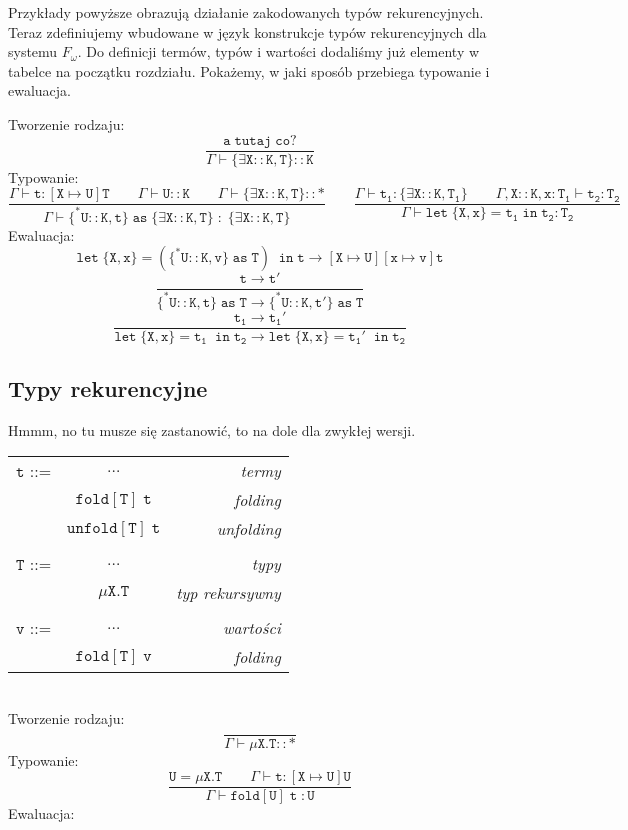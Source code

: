 \documentclass[11pt,leqno]{article}
\begin{document}
\normalsize{
Przykłady powyższe obrazują działanie zakodowanych typów rekurencyjnych. Teraz zdefiniujemy wbudowane w język konstrukcje typów rekurencyjnych dla systemu $F_\omega$. Do definicji termów, typów i wartości dodaliśmy już elementy w tabelce na początku rozdziału. Pokażemy, w jaki sposób przebiega typowanie i ewaluacja. \\
}


Tworzenie rodzaju:
 	\[\mathtt{ \frac{a\;tutaj\;co?}{\Gamma \vdash \{\exists X::K,T\}::K}
		}
	\]
Typowanie:
 	\[\mathtt{ \frac{\Gamma \vdash t:[X \mapsto U]T\hspace{2em}\Gamma \vdash U::K \hspace{2em}\Gamma \vdash \{\exists X::K,T\}::\ast}{\Gamma \vdash \{^*U::K,t\}\;as\;\{\exists X::K,T\} \; : \; \{\exists X::K,T\}}
                   \qquad
                   \frac{\Gamma \vdash t_1:\{\exists X::K,T_1\}\hspace{2em}\Gamma,X::K,x:T_1 \vdash t_2:T_2}{\Gamma \vdash let\;\{X,x\}=t_1\;in\;t_2:T_2}
		}
	\]
Ewaluacja:
 	\[\mathtt{ let\;\{X,x\}=(\{^*U::K,v\}\;as\;T)\;\;in\;t \longrightarrow [X \mapsto U][x \mapsto v]t
		}
	\]
 	\[\mathtt{ \frac{t \longrightarrow t'}{\{^*U::K,t\}\;as\;T \longrightarrow \{^*U::K,t'\}\;as\;T}
		}
	\]
 	\[\mathtt{ \frac{t_1\longrightarrow t_1'}{let\;\{X,x\}=t_1\;\;in\;t_2 \longrightarrow let\;\{X,x\}=t_1'\;\;in\;t_2}
		}
	\]
\subsection{Typy rekurencyjne}

Hmmm, no tu musze się zastanowić, to na dole dla zwykłej wersji. \\
\begin{tabular}{| l c r |}
  \hline
  $\mathtt{t}$ ::= & $\dots$ & \textit{termy}  \\
   & $\mathtt{fold[T]\;t}$ & \textit{folding} \\
   & $\mathtt{unfold[T]\;t}$ & \textit{unfolding}\\
   & & \\
  $\mathtt{T}$ ::= & $\dots$ & \textit{typy}  \\
   & $\mathtt{\mu X.T}$ & \textit{typ rekursywny} \\
   & & \\
  $\mathtt{v}$ ::= & $\dots$ & \textit{wartości}  \\
   & $\mathtt{fold[T]\;v}$ & \textit{folding} \\
  \hline  
\end{tabular} \\
Tworzenie rodzaju:
 	\[\mathtt{\frac{}{\Gamma \vdash \mu X.T::\ast}
		}
	\]
Typowanie:
 	\[\mathtt{ \frac{ U=\mu X.T \hspace{2em} \Gamma \vdash t:[X\mapsto U]U}{\Gamma \vdash fold[U]\;t\; : U}
		}
	\]
Ewaluacja:
 	\[\mathtt{
		}
	\]
\end{document}
